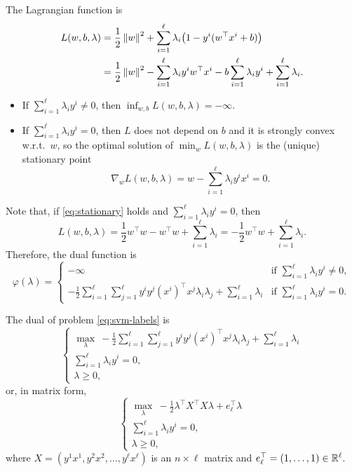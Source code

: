 The Lagrangian function is
\begin{align*}
    L(w, b, \lambda) &= \frac{1}{2} \left\lVert w \right\rVert^2 + \sum_{i=1}^{\ell} \lambda_i \bigl(1 - y^i (w^\top x^i + b)\bigr) \\
    &= \frac{1}{2} \left\lVert w \right\rVert^2 - \sum_{i=1}^{\ell} \lambda_i y^i w^\top x^i - b \sum_{i=1}^{\ell} \lambda_i y^i + \sum_{i=1}^{\ell} \lambda_i.
\end{align*}
\begin{itemize}
    \item If $\sum_{i=1}^{\ell} \lambda_i y^i \ne 0$, then $\inf_{w, b} L(w, b, \lambda) = -\infty$.
    \item If $\sum_{i=1}^{\ell} \lambda_i y^i = 0$, then $L$ does not depend on $b$ and it is strongly convex w.r.t.\ $w$, so the optimal solution of $\min_w L(w, b, \lambda)$ is the (unique) stationary point
    \begin{equation}
        \nabla_w L(w, b, \lambda) = w - \sum_{i=1}^{\ell} \lambda_i y^i x^i = 0.
        \label{eq:stationary}
    \end{equation}
\end{itemize}

Note that, if \cref{eq:stationary} holds and $\sum_{i=1}^{\ell} \lambda_i y^i = 0$, then
\[
    L(w, b, \lambda) = \frac{1}{2} w^\top w - w^\top w + \sum_{i=1}^{\ell} \lambda_i = -\frac{1}{2} w^\top w + \sum_{i=1}^{\ell} \lambda_i.
\]
Therefore, the dual function is
\[
    \varphi(\lambda) =
    \begin{cases}
        -\infty & \text{if } \sum_{i=1}^{\ell} \lambda_i y^i \ne 0, \\[1ex]
        \displaystyle -\frac{1}{2} \sum_{i=1}^{\ell} \sum_{j=1}^{\ell} y^i y^j (x^i)^\top x^j \lambda_i \lambda_j + \sum_{i=1}^{\ell} \lambda_i & \text{if } \sum_{i=1}^{\ell} \lambda_i y^i = 0.
    \end{cases}
\]

The dual of problem \cref{eq:svm-labels} is
\begin{equation}
    \begin{cases}
        \displaystyle \max_{\lambda} \ -\frac{1}{2} \sum_{i=1}^{\ell} \sum_{j=1}^{\ell} y^i y^j (x^i)^\top x^j \lambda_i \lambda_j + \sum_{i=1}^{\ell} \lambda_i \\
        \displaystyle \sum_{i=1}^{\ell} \lambda_i y^i = 0, \\
        \lambda \ge 0,
    \end{cases}
    \label{eq:svm-dual}
\end{equation}
or, in matrix form,
\[
    \begin{cases}
        \displaystyle \max_{\lambda} \ -\frac{1}{2} \lambda^\top X^\top X \lambda + e_\ell^\top \lambda \\
        \displaystyle \sum_{i=1}^{\ell} \lambda_i y^i = 0, \\
        \lambda \ge 0,
    \end{cases}
\]
where $X = (y^1 x^1, y^2 x^2, \dots, y^\ell x^\ell)$ is an $n \times \ell$ matrix and $e_\ell^\top = (1, \dots, 1) \in \mathbb{R}^\ell$.

